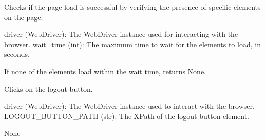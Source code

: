 \documentclass[letterpaper,10pt,english]{sphinxmanual}
\begin{document}

\begin{fulllineitems}
\label{\detokenize{utils:utils.authentication_management.check_successful_page_load}}
\pysigstartsignatures
{}
\pysigstopsignatures
\sphinxAtStartPar
Checks if the page load is successful by verifying the presence of specific elements on the page.
\begin{description}
\sphinxAtStartPar
driver (WebDriver): The WebDriver instance used for interacting with the browser.
wait\_time (int): The maximum time to wait for the elements to load, in seconds.

\begin{description}
\sphinxAtStartPar
If none of the elements load within the wait time, returns None.

\end{description}

\end{description}

\end{fulllineitems}


\begin{fulllineitems}
\label{\detokenize{utils:utils.authentication_management.click_on_logout}}
\pysigstartsignatures
{}
\pysigstopsignatures
\sphinxAtStartPar
Clicks on the logout button.
\begin{description}
\sphinxAtStartPar
driver (WebDriver): The WebDriver instance used to interact with the browser.
LOGOUT\_BUTTON\_PATH (str): The XPath of the logout button element.

\sphinxAtStartPar
None

\end{description}

\end{fulllineitems}
\end{document}
